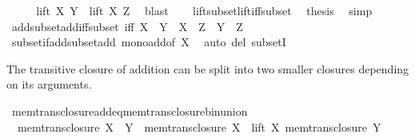 \begin{isabellebody}
\ \ \isamarkupfalse%
\ \isamarkupfalse%
\ {\isachardoublequoteopen}lift\ X\ Y\ {\isasymsubseteq}\ lift\ X\ Z{\isachardoublequoteclose}\ \isamarkupfalse%
\ blast\isanewline
\ \ \isamarkupfalse%
\ lift{\isacharunderscore}{\kern0pt}subset{\isacharunderscore}{\kern0pt}lift{\isacharunderscore}{\kern0pt}iff{\isacharunderscore}{\kern0pt}subset\ \isamarkupfalse%
\ {\isacharquery}{\kern0pt}thesis\ \isamarkupfalse%
\ simp\isanewline
{}\isamarkupfalse%
%
\endisatagproof
{\isafoldproof}%
%
\isadelimproof
\isanewline
%
\endisadelimproof
\isanewline
{}\isamarkupfalse%
\ add{\isacharunderscore}{\kern0pt}subset{\isacharunderscore}{\kern0pt}add{\isacharunderscore}{\kern0pt}iff{\isacharunderscore}{\kern0pt}subset\ {\isacharbrackleft}{\kern0pt}iff{\isacharbrackright}{\kern0pt}{\isacharcolon}{\kern0pt}\ {\isachardoublequoteopen}X\ {\isacharplus}{\kern0pt}\ Y\ {\isasymsubseteq}\ X\ {\isacharplus}{\kern0pt}\ Z\ {\isasymlongleftrightarrow}\ Y\ {\isasymsubseteq}\ Z{\isachardoublequoteclose}\isanewline
%
\isadelimproof
\ \ %
\endisadelimproof
%
\isatagproof
{}\isamarkupfalse%
\ subset{\isacharunderscore}{\kern0pt}if{\isacharunderscore}{\kern0pt}add{\isacharunderscore}{\kern0pt}subset{\isacharunderscore}{\kern0pt}add\ mono{\isacharunderscore}{\kern0pt}add{\isacharbrackleft}{\kern0pt}of\ X{\isacharbrackright}{\kern0pt}\ \isamarkupfalse%
\ {\isacharparenleft}{\kern0pt}auto\ del{\isacharcolon}{\kern0pt}\ subsetI{\isacharparenright}{\kern0pt}%
\endisatagproof
{\isafoldproof}%
%
\isadelimproof
%
\endisadelimproof
%
\begin{isamarkuptext}%
The transitive closure of addition can be split into two smaller
closures depending on its arguments.%
\end{isamarkuptext}\isamarkuptrue%
\isamarkupfalse%
\ mem{\isacharunderscore}{\kern0pt}trans{\isacharunderscore}{\kern0pt}closure{\isacharunderscore}{\kern0pt}add{\isacharunderscore}{\kern0pt}eq{\isacharunderscore}{\kern0pt}mem{\isacharunderscore}{\kern0pt}trans{\isacharunderscore}{\kern0pt}closure{\isacharunderscore}{\kern0pt}bin{\isacharunderscore}{\kern0pt}union{\isacharcolon}{\kern0pt}\isanewline
\ \ {\isachardoublequoteopen}mem{\isacharunderscore}{\kern0pt}trans{\isacharunderscore}{\kern0pt}closure\ {\isacharparenleft}{\kern0pt}X\ {\isacharplus}{\kern0pt}\ Y{\isacharparenright}{\kern0pt}\ {\isacharequal}{\kern0pt}\ mem{\isacharunderscore}{\kern0pt}trans{\isacharunderscore}{\kern0pt}closure\ X\ {\isasymunion}\ lift\ X\ {\isacharparenleft}{\kern0pt}mem{\isacharunderscore}{\kern0pt}trans{\isacharunderscore}{\kern0pt}closure\ Y{\isacharparenright}{\kern0pt}{\isachardoublequoteclose}\isanewline

\end{isabellebody}
